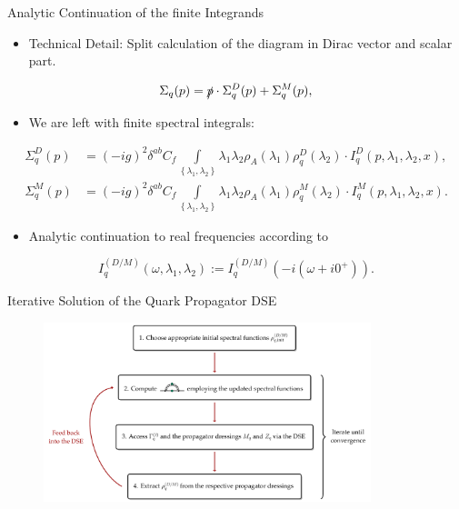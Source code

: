 \begin{frame}{Analytic Continuation of the finite Integrands}
\begin{itemize}
	\item Technical Detail: Split calculation of the diagram in Dirac vector and scalar part.
\end{itemize}
\begin{equation}
	\Sigma_q(p) =\slashed{p}\cdot\Sigma_{q}^D(p) + \Sigma_{q}^M(p),
\end{equation}
\begin{itemize}
	\item We are left with \alert{finite} spectral integrals:
\end{itemize}
\begin{align}
\Sigma_{q}^D(p) &= (-ig)^2\delta^{ab}C_f\int\limits_{\left\{\lambda_1,\lambda_2\right\}}\lambda_1\lambda_2\rho_A(\lambda_1)\rho_q^D(\lambda_2)\cdot I_q^D\left(p, \lambda_1, \lambda_2,x\right),\\
\Sigma_{q}^M(p) &= (-ig)^2\delta^{ab}C_f\int\limits_{\left\{\lambda_1,\lambda_2\right\}}\lambda_1\lambda_2\rho_A(\lambda_1)\rho_q^M(\lambda_2)\cdot I_q^M\left(p, \lambda_1, \lambda_2,x\right).
\end{align}
\begin{itemize}
	\item Analytic continuation to real frequencies according to
\end{itemize}
\begin{equation}
	I_q^{(D/M)}\left(\omega, \lambda_1, \lambda_2\right) := I_q^{(D/M)}\left(-i(\omega + i0^+)\right).
\end{equation}
\end{frame}

\begin{frame}{Iterative Solution of the Quark Propagator DSE}
\begin{figure}[t]
	\hspace{-2em}
	\includegraphics[width = 0.85\textwidth]{figs/tikz/iterative_computation}
\end{figure}
\end{frame}


